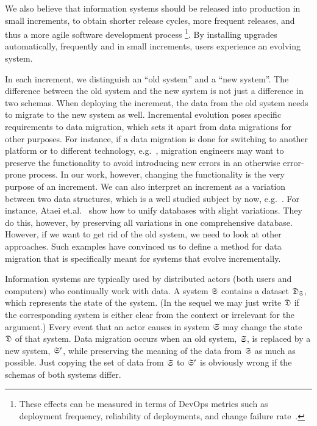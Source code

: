 \documentclass{elsarticle}
\begin{document}
   We also believe that information systems should be released into production in small increments,
   to obtain shorter release cycles, more frequent releases, and thus a more agile software development process%
   \footnote{These effects can be measured in terms of DevOps metrics such as
   deployment frequency,
   reliability of deployments, and
   change failure rate~\cite{DevOps2021}.}.
   By installing upgrades automatically, frequently and in small increments,
   users experience an evolving system.

   In each increment, we distinguish an ``old system'' and a ``new system''.
   The difference between the old system and the new system is not just a difference in two schemas.
   When deploying the increment, the data from the old system needs to migrate to the new system as well.
   Incremental evolution poses specific requirements to data migration,
   which sets it apart from data migrations for other purposes.
   For instance, if a data migration is done for switching to another platform or to different technology,
   e.g.~\cite{Gholami2016,Bisbal1999},
   migration engineers may want to preserve the functionality to avoid introducing new errors in an otherwise error-prone process.
   In our work, however, changing the functionality is the very purpose of an increment.
   We can also interpret an increment as a variation between two data structures,
   which is a well studied subject by now, e.g.~\cite{Walkingshaw2014}.
   For instance, Ataei et.al.~\cite{Ataei2021} show how to unify databases with slight variations.
   They do this, however, by preserving all variations in one comprehensive database.
   However, if we want to get rid of the old system, we need to look at other approaches.
   Such examples have convinced us to define a method for data migration that is specifically meant for systems that evolve incrementally.
   
   Information systems are typically used by distributed actors (both users and computers) who continually work with data.
   A system $\mathfrak{S}$ contains a dataset $\mathfrak{D}_{\mathfrak{S}}$, which represents the state of the system.
   (In the sequel we may just write $\mathfrak{D}$
   if the corresponding system is either clear from the context or irrelevant for the argument.)
   Every event that an actor causes in system $\mathfrak{S}$ may change the state $\mathfrak{D}$ of that system.
   Data migration occurs when an old system, $\mathfrak{S}$, is replaced by a new system, $\mathfrak{S}'$,
   while preserving the meaning of the data from $\mathfrak{S}$ as much as possible.
   Just copying the set of data from $\mathfrak{S}$ to $\mathfrak{S}'$ is obviously wrong if the schemas of both systems differ.
   
\end{document}
